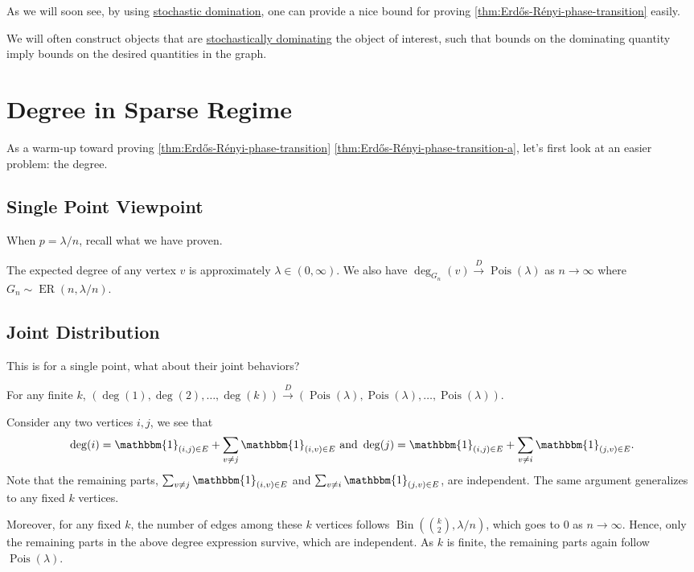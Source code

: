 As we will soon see, by using \hyperref[def:stochastic-domination]{stochastic domination}, one can provide a nice bound for proving \autoref{thm:Erdős-Rényi-phase-transition} easily.

\begin{intuition}
	We will often construct objects that are \hyperref[def:stochastic-domination]{stochastically dominating} the object of interest, such that bounds on the dominating quantity imply bounds on the desired quantities in the graph.
\end{intuition}

\section{Degree in Sparse Regime}
As a warm-up toward proving \autoref{thm:Erdős-Rényi-phase-transition} \autoref{thm:Erdős-Rényi-phase-transition-a}, let's first look at an easier problem: the degree.

\subsection{Single Point Viewpoint}
When \(p = \lambda / n\), recall what we have proven.

\begin{prev}
	The expected degree of any vertex \(v\) is approximately \(\lambda \in (0, \infty )\). We also have \(\deg_{G_n}(v) \overset{D}{\to} \operatorname{Pois}(\lambda ) \) as \(n \to \infty \) where \(G_n \sim \operatorname{ER}(n, \lambda / n) \).
\end{prev}

\subsection{Joint Distribution}
This is for a single point, what about their joint behaviors?

\begin{claim}
	For any finite \(k\), \((\deg(1), \deg(2), \dots , \deg(k)) \overset{D}{\to} (\operatorname{Pois}(\lambda ) , \operatorname{Pois}(\lambda ), \dots , \operatorname{Pois}(\lambda ) )\).
\end{claim}
\begin{explanation}
	Consider any two vertices \(i, j\), we see that
	\[
		\deg(i) = \mathbbm{1}_{(i, j) \in E} + \sum_{v \neq j} \mathbbm{1}_{(i, v) \in E} \text{ and }
		\deg(j) = \mathbbm{1}_{(i, j) \in E} + \sum_{v \neq i} \mathbbm{1}_{(j, v) \in E}.
	\]
	Note that the remaining parts, \(\sum_{v \neq j} \mathbbm{1}_{(i, v) \in E} \) and \(\sum_{v \neq i} \mathbbm{1}_{(j, v) \in E} \), are independent. The same argument generalizes to any fixed \(k\) vertices.

	Moreover, for any fixed \(k\), the number of edges among these \(k\) vertices follows \(\operatorname{Bin}(\binom{k}{2}, \lambda / n) \), which goes to \(0\) as \(n \to \infty \). Hence, only the remaining parts in the above degree expression survive, which are independent. As \(k\) is finite, the remaining parts again follow \(\operatorname{Pois}(\lambda ) \).
\end{explanation}

